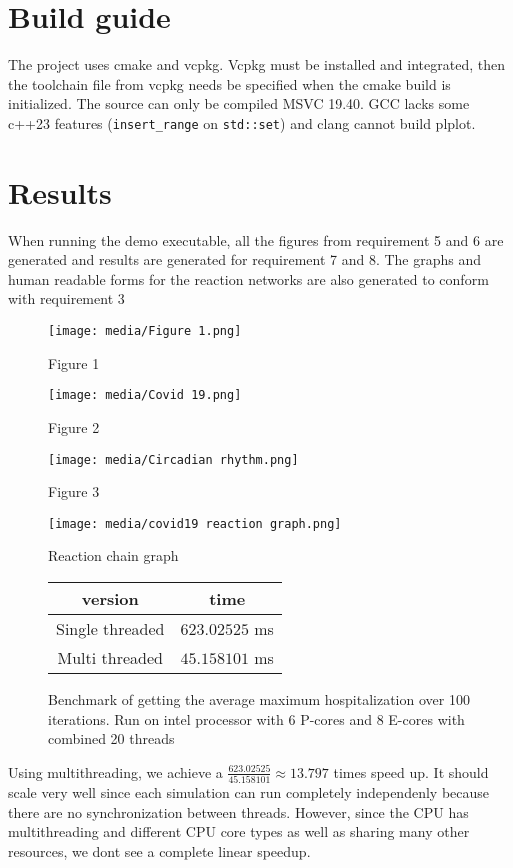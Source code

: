 \section{Build guide}
The project uses cmake and vcpkg. Vcpkg must be installed and integrated, then the toolchain file from vcpkg needs be specified when the cmake build is initialized. The source can only be compiled MSVC 19.40. GCC lacks some c++23 features (\texttt{insert_range} on \texttt{std::set}) and clang cannot build plplot.

\section {Results}

When running the demo executable, all the figures from requirement 5 and 6 are generated and results are generated for requirement 7 and 8.
The graphs and human readable forms for the reaction networks are also generated to conform with requirement 3

\begin{figure}[H]
    \centering
    \texttt{[image: media/Figure 1.png]}
    \caption{Figure 1}
\end{figure}

\begin{figure}[H]
    \centering
    \texttt{[image: media/Covid 19.png]}
    \caption{Figure 2}
\end{figure}

\begin{figure}[H]
    \centering
    \texttt{[image: media/Circadian rhythm.png]}
    \caption{Figure 3}
\end{figure}

\begin{figure}[H]
    \centering
    \texttt{[image: media/covid19 reaction graph.png]}
    \caption{Reaction chain graph}
\end{figure}

\begin{figure}[H]
    \centering
    \begin{tabular}{ c c }
        \hline
        version & time \\
        \hline
        Single threaded & $623.02525$ ms \\
        Multi threaded & $45.158101$ ms \\
        \hline
    \end{tabular}
    \caption{Benchmark of getting the average maximum hospitalization over 100 iterations. Run on  intel processor with 6 P-cores and 8 E-cores with combined 20 threads}
\end{figure}

Using multithreading, we achieve a $\frac{623.02525}{45.158101}\approx13.797$ times speed up. It should scale very well since each simulation can run completely independenly because there are no synchronization between threads. However, since the CPU has multithreading and different CPU core types as well as sharing many other resources, we dont see a complete linear speedup.
\FloatBarrier
\newpage